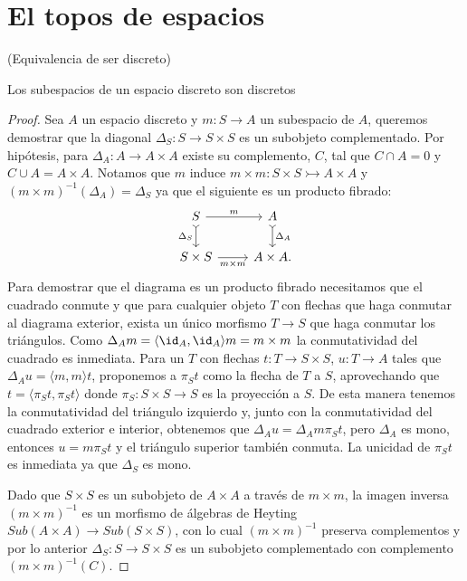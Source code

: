 \chapter{El topos de espacios}
\label{espacios}

(Equivalencia de ser discreto)

\begin{proposition}
  Los subespacios de un espacio discreto son discretos
\end{proposition}
\begin{proof}
  Sea $A$ un espacio discreto y $m\colon S\to A$ un subespacio de $A$, queremos demostrar que la 
  diagonal $\Delta_S\colon S\to S\times S$ es un subobjeto complementado. Por hipótesis, para $\Delta_A\colon A\to A\times A$
  existe su complemento, $C$, tal que $C\cap A=0$ y $C\cup A=A\times A$. Notamos que
  $m$ induce $m\times m\colon S\times S \rightarrowtail A\times A$ y $(m\times m)^{-1}(\Delta_A)=\Delta_S$ ya que el siguiente es un producto fibrado:
  \begin{equation*}
    \begin{tikzcd}
        S\ar{r}{m} \ar[tail]{d}[swap]{\Delta_S} & A\ar[tail]{d}{\Delta_A}\\
        S\times S\ar{r}[swap]{m\times m} & A\times A.
    \end{tikzcd}
  \end{equation*}
  Para demostrar que el diagrama es un producto fibrado necesitamos que el cuadrado conmute
  y que para cualquier objeto $T$ con flechas que haga conmutar al diagrama exterior, exista 
  un único morfismo $T\to S$ que haga conmutar los triángulos. Como $\Delta_A m = \langle \id_A, \id_A\rangle m = m\times m$ la conmutatividad
  del cuadrado es inmediata. Para un $T$ con flechas $t\colon T\to S\times S$, $u\colon T\to A$ tales
  que $\Delta_A u = \langle m, m\rangle t$, proponemos a $\pi_S t$ como la flecha de $T$
  a $S$, aprovechando que $t=\langle\pi_S t, \pi_S t\rangle$ donde $\pi_S\colon S\times S \to S$
  es la proyección a $S$. De esta manera tenemos la conmutatividad del triángulo izquierdo
  y, junto con la conmutatividad del cuadrado exterior e interior, obtenemos que $\Delta_A u
  = \Delta_A m \pi_S t$, pero $\Delta_A$ es mono, entonces $u=m \pi_S t$ y el triángulo superior
  también conmuta. La unicidad de $\pi_S t$ es inmediata ya que $\Delta_S$ es
  mono.
  

  Dado que $S\times S$ es un subobjeto de $A\times A$ a través de $m\times m$, la imagen
  inversa $(m\times m)^{-1}$ es un morfismo de álgebras de Heyting $Sub(A\times A)\to Sub(S\times S)$,
  con lo cual $(m\times m)^{-1}$ preserva complementos y por lo anterior $\Delta_S\colon S\to S\times S$ es un
  subobjeto complementado con complemento $(m\times m)^{-1}(C)$.

\end{proof}

